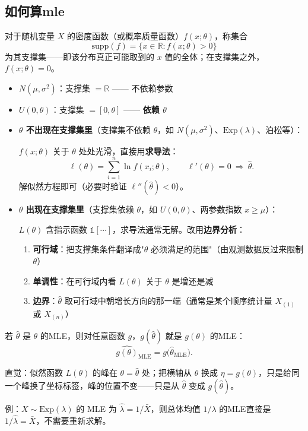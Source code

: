 \subsection{如何算mle}
\begin{definition}[支撑集]
对于随机变量 $X$ 的密度函数（或概率质量函数）$f(x;\theta)$，称集合
\[
\mathrm{supp}(f)=\{x\in\mathbb{R}: f(x;\theta)>0\}
\]
为其支撑集——即该分布真正可能取到的 $x$ 值的全体；在支撑集之外，$f(x;\theta)=0$。

\begin{itemize}
    \item $N(\mu,\sigma^2)$：支撑集 $=\mathbb{R}$ —— 不依赖参数
    \item $U(0,\theta)$：支撑集 $=[0,\theta]$ —— \textbf{依赖 $\theta$}
\end{itemize}
\end{definition}
\begin{note}
\begin{itemize}
    \item \textbf{$\theta$ 不出现在支撑集里}（支撑集不依赖 $\theta$，如 $N(\mu,\sigma^2)$、$\mathrm{Exp}(\lambda)$、泊松等）：

    $f(x;\theta)$ 关于 $\theta$ 处处光滑，直接用\textbf{求导法}：
    \[
    \ell(\theta)=\sum_{i=1}^n\ln f(x_i;\theta),\qquad \ell'(\theta)=0\ \Longrightarrow\ \hat\theta.
    \]
    解似然方程即可（必要时验证 $\ell''(\hat\theta)<0$）。

    \item \textbf{$\theta$ 出现在支撑集里}（支撑集依赖 $\theta$，如 $U(0,\theta)$、两参数指数 $x\ge\mu$）：

    $L(\theta)$ 含指示函数 $\mathbb{1}[\cdots]$，求导法通常无解。改用\textbf{边界分析}：
    \begin{enumerate}
        \item \textbf{可行域}：把支撑集条件翻译成"$\theta$ 必须满足的范围"（由观测数据反过来限制 $\theta$）
        \item \textbf{单调性}：在可行域内看 $L(\theta)$ 关于 $\theta$ 是增还是减
        \item \textbf{边界}：$\hat\theta$ 取可行域中朝增长方向的那一端（通常是某个顺序统计量 $X_{(1)}$ 或 $X_{(n)}$）
    \end{enumerate}
\end{itemize}
\end{note}
\begin{note}
若 $\hat\theta$ 是 $\theta$ 的MLE，则对任意函数 $g$，$g(\hat\theta)$ 就是 $g(\theta)$ 的MLE：
\[
\widehat{g(\theta)}_{\mathrm{MLE}}=g\big(\hat\theta_{\mathrm{MLE}}\big).
\]

直觉：似然函数 $L(\theta)$ 的峰在 $\theta=\hat\theta$ 处；把横轴从 $\theta$ 换成 $\eta=g(\theta)$，只是给同一个峰换了坐标标签，峰的位置不变——只是从 $\hat\theta$ 变成 $g(\hat\theta)$。

例：$X\sim\mathrm{Exp}(\lambda)$ 的 MLE 为 $\hat\lambda=1/\bar X$，则总体均值 $1/\lambda$ 的MLE直接是 $1/\hat\lambda=\bar X$，不需要重新求解。
\end{note}
